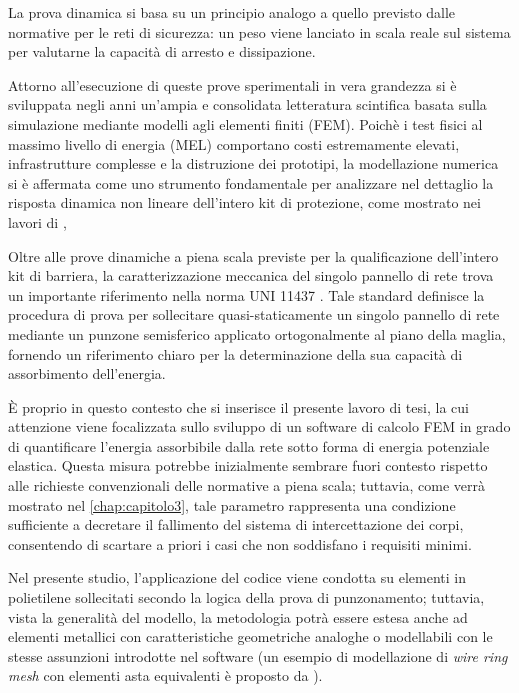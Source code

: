La prova dinamica si basa su un principio analogo a quello previsto dalle normative per le reti di sicurezza: un peso viene lanciato in scala reale sul sistema per valutarne la capacità di arresto e dissipazione.

Attorno all'esecuzione di queste prove sperimentali in vera grandezza si è sviluppata negli anni un'ampia e consolidata letteratura scintifica basata sulla simulazione mediante modelli agli elementi finiti (FEM). Poichè i test fisici al massimo livello di energia (MEL) comportano costi estremamente elevati, infrastrutture complesse e la distruzione dei prototipi, la modellazione numerica si è affermata come uno strumento fondamentale per analizzare nel dettaglio la risposta dinamica non lineare dell'intero kit di protezione, come mostrato nei lavori di \textcite{gentilini2012,gentilini2013},

Oltre alle prove dinamiche a piena scala previste per la qualificazione dell'intero kit di barriera, la caratterizzazione meccanica del singolo pannello di rete trova un importante riferimento nella norma UNI 11437 \cite{UNI11437-3}. Tale standard definisce la procedura di prova per sollecitare quasi-staticamente un singolo pannello di rete mediante un punzone semisferico applicato ortogonalmente al piano della maglia, fornendo un riferimento chiaro per la determinazione della sua capacità di assorbimento dell'energia.

È proprio in questo contesto che si inserisce il presente lavoro di tesi, la cui attenzione viene focalizzata sullo sviluppo di un software di calcolo FEM in grado di quantificare l'energia assorbibile dalla rete sotto forma di energia potenziale elastica. Questa misura potrebbe inizialmente sembrare fuori contesto rispetto alle richieste convenzionali delle normative a piena scala; tuttavia, come verrà mostrato nel \cref{chap:capitolo3}, tale parametro rappresenta una condizione sufficiente a decretare il fallimento del sistema di intercettazione dei corpi, consentendo di scartare a priori i casi che non soddisfano i requisiti minimi.

Nel presente studio, l'applicazione del codice viene condotta su elementi in polietilene sollecitati secondo la logica della prova di punzonamento; tuttavia, vista la generalità del modello, la metodologia potrà essere estesa anche ad elementi metallici con caratteristiche geometriche analoghe o modellabili con le stesse assunzioni introdotte nel software (un esempio di modellazione di \textit{wire ring mesh} con elementi asta equivalenti è proposto da \textcite{gentilini2013}).

